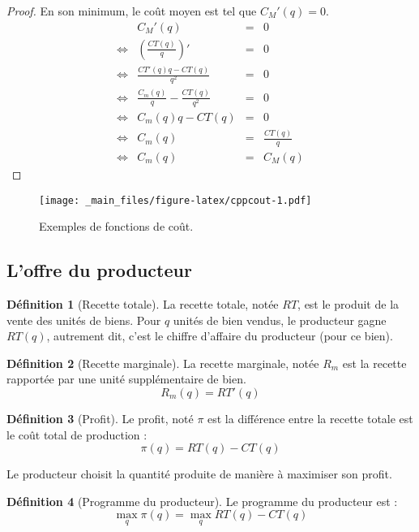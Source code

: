 \documentclass[
]{book}
\theoremstyle{definition}
\newtheorem{definition}{Définition}[chapter]
\theoremstyle{definition}
\theoremstyle{definition}
\theoremstyle{definition}
\theoremstyle{remark}
\begin{document}
\begin{proof}
En son minimum, le coût moyen est tel que \(C_M'(q)=0\).
\[
\begin{array}{crcl}
&C_M'(q)&=&0\\
\Leftrightarrow & \left(\frac{CT(q)}{q}\right)'&=& 0\\
\Leftrightarrow & \frac{CT'(q)q-CT(q)}{q^2}&=& 0\\
\Leftrightarrow & \frac{C_m(q)}{q}-\frac{CT(q)}{q^2}&=& 0\\
\Leftrightarrow & C_m(q)q-CT(q)&=& 0\\
\Leftrightarrow & C_m(q)&=& \frac{CT(q)}{q}\\
\Leftrightarrow & C_m(q)&=& C_M(q)
\end{array}
\]
\end{proof}

\begin{figure}
\centering
\texttt{[image: \_main\_files/figure-latex/cppcout-1.pdf]}
\caption{\label{fig:cppcout}Exemples de fonctions de coût.}
\end{figure}

\hypertarget{loffre-du-producteur}{%
\subsection{L'offre du producteur}\label{loffre-du-producteur}}

\begin{definition}[Recette totale]
La recette totale, notée \(RT\), est le produit de la vente des unités de biens.
Pour \(q\) unités de bien vendus, le producteur gagne \(RT(q)\), autrement dit, c'est le chiffre d'affaire du producteur (pour ce bien).
\end{definition}

\begin{definition}[Recette marginale]
La recette marginale, notée \(R_m\) est la recette rapportée par une unité supplémentaire de bien.
\[R_m(q)=RT'(q)\]
\end{definition}

\begin{definition}[Profit]
Le profit, noté \(\pi\) est la différence entre la recette totale est le coût total de production :
\[\pi(q)=RT(q)-CT(q)\]
\end{definition}

Le producteur choisit la quantité produite de manière à maximiser son profit.

\begin{definition}[Programme du producteur]
Le programme du producteur est :
\[\max_q\pi(q)=\max_q RT(q)-CT(q)\]
\end{definition}
\end{document}
